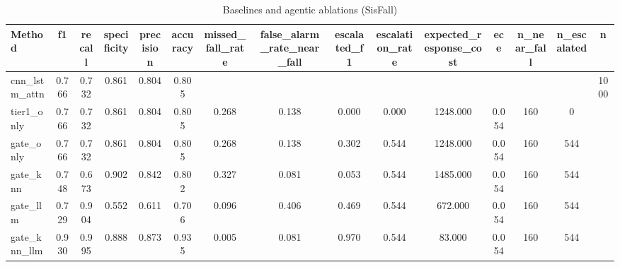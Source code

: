 \begin{table}[t]
\centering
\caption{Baselines and agentic ablations (SisFall)}
\begin{tabular}{lcccccccccccccc}
\toprule
Method & f1 & recall & specificity & precision & accuracy & missed_fall_rate & false_alarm_rate_near_fall & escalated_f1 & escalation_rate & expected_response_cost & ece & n_near_fall & n_escalated & n \\
\midrule
cnn_lstm_attn & 0.766 & 0.732 & 0.861 & 0.804 & 0.805 &  &  &  &  &  &  &  &  & 1000 \\
tier1_only & 0.766 & 0.732 & 0.861 & 0.804 & 0.805 & 0.268 & 0.138 & 0.000 & 0.000 & 1248.000 & 0.054 & 160 & 0 &  \\
gate_only & 0.766 & 0.732 & 0.861 & 0.804 & 0.805 & 0.268 & 0.138 & 0.302 & 0.544 & 1248.000 & 0.054 & 160 & 544 &  \\
gate_knn & 0.748 & 0.673 & 0.902 & 0.842 & 0.802 & 0.327 & 0.081 & 0.053 & 0.544 & 1485.000 & 0.054 & 160 & 544 &  \\
gate_llm & 0.729 & 0.904 & 0.552 & 0.611 & 0.706 & 0.096 & 0.406 & 0.469 & 0.544 & 672.000 & 0.054 & 160 & 544 &  \\
gate_knn_llm & 0.930 & 0.995 & 0.888 & 0.873 & 0.935 & 0.005 & 0.081 & 0.970 & 0.544 & 83.000 & 0.054 & 160 & 544 &  \\
\bottomrule
\end{tabular}
\end{table}